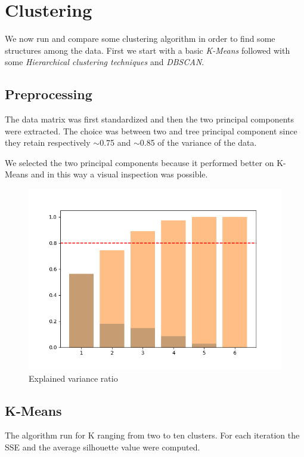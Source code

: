 \section{Clustering}
We now run and compare some clustering algorithm in order to find some structures among the data. First we start with a basic \emph{K-Means} followed with some \emph{Hierarchical clustering techniques} and \emph{DBSCAN}. 
\subsection{Preprocessing}
The data matrix was first standardized and then the two principal components were extracted. The choice was between two and tree principal component since they retain respectively $\sim$0.75 and $\sim$0.85 of the variance of the data.

We selected the two principal components because it performed better on K-Means and in this way a visual inspection was possible.

\begin{figure}[h!]
    \centering
    \includegraphics[scale=0.4]{img/clust_1/pca.png}
    \caption{Explained variance ratio}
    \label{fig:pca_img}
\end{figure}

\subsection{K-Means}
The algorithm run for K ranging from two to ten clusters. For each iteration the SSE and the average silhouette value were computed.

